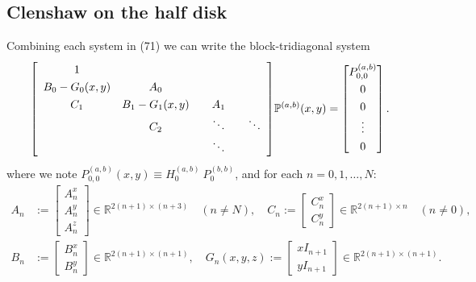\documentclass[11pt, oneside]{article}   	%
\newcommand{\R}{\mathbb{R}}
\newcommand{\bigP}{\mathbb{P}}
\newcommand{\bigPab}{\bigP^{(a,b)}}
\begin{document}
\subsection{Clenshaw on the half disk}

Combining each system in (71) we can write the block-tridiagonal system
\begin{align}
\renewcommand\arraystretch{1.3}
\mleft[
\begin{array}{cccc}
		1 & & & \\
		B_0-G_0(x,y) & A_0 & & \\
		C_1 & B_1-G_1(x,y) & \quad A_1 \quad & \\
		& C_2 & \ddots & \ddots \\
		& & \ddots &
\end{array}
\mright]
\bigPab(x,y)
=
\begin{bmatrix}
	P^{(a,b)}_{0,0} \\ 0 \\ 0 \\ \vdots \\ 0 \\
\end{bmatrix}.
\end{align}
where we note \(P^{(a,b)}_{0,0}(x,y) \equiv H_0^{(a,b)} \: P_0^{(b,b)}\), and for each \(n = 0,1,\dots,N\):
\begin{align}
A_n &:= \begin{bmatrix}
		A^x_n \\
		A^y_n \\
		A^z_n
	    \end{bmatrix} \in \R^{2(n+1)\times(n+3)} \quad (n \ne N), \quad
C_n := \begin{bmatrix}
		C^x_n \\
		C^y_n
	    \end{bmatrix} \in \R^{2(n+1)\times n} \quad (n \ne 0), \nonumber \\
B_n &:= \begin{bmatrix}
		B^x_n \\
		B^y_n
	    \end{bmatrix} \in \R^{2(n+1)\times(n+1)}, \quad
G_n(x,y,z) := \begin{bmatrix}
		xI_{n+1} \\
		yI_{n+1}
	    \end{bmatrix} \in \R^{2(n+1)\times(n+1)}.
\end{align}
 
\end{document}
